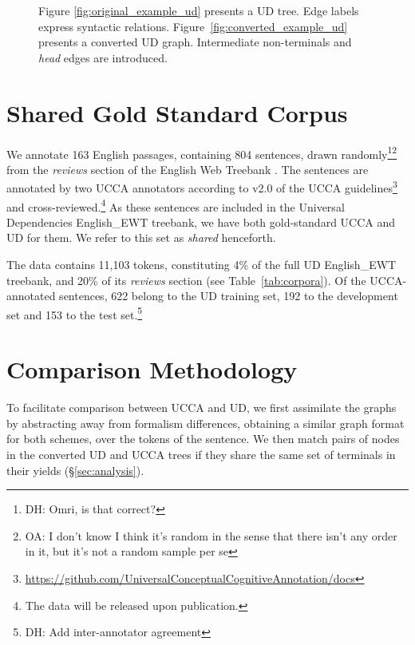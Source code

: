 \documentclass[11pt,a4paper]{article}
\newcommand{\oa}[1]{\footnote{\color{red}OA: #1}}
\newcommand{\daniel}[1]{\footnote{\color{blue}DH: #1}}
\begin{document}
\begin{figure}[!ht]
\caption{Figure \ref{fig:original_example_ud} presents a UD tree.
  Edge labels express syntactic relations.
Figure~\ref{fig:converted_example_ud} presents a converted UD graph.
Intermediate non-terminals and \textit{head} edges are introduced.
}\label{fig:ud_examples}
\end{figure}


\section{Shared Gold Standard Corpus}\label{sec:shared}

We annotate 163 English passages, containing 804 sentences,
drawn randomly\daniel{Omri, is that correct?}\oa{I don't know I think it's random in the sense that there isn't any order in it, but it's not a random sample per se} from the \textit{reviews} section of the 
English Web Treebank \cite[EWT; ][]{bies2012english}.
The sentences are annotated by two UCCA annotators
according to v2.0 of the UCCA
guidelines\footnote{\url{https://github.com/UniversalConceptualCognitiveAnnotation/docs}}
and cross-reviewed.\footnote{The data will be released upon publication.}
As these sentences are included in the Universal Dependencies 
English\_EWT treebank, we have both gold-standard UCCA and UD for them. 
We refer to this set as \textit{shared} henceforth.

The data contains 11,103 tokens, constituting 4\% of the full UD English\_EWT treebank,
and 20\% of its \textit{reviews} section
(see Table~\ref{tab:corpora}).
Of the UCCA-annotated sentences, 622 belong to the UD training set,
192 to the development set and 153 to the test set.\daniel{Add inter-annotator agreement}


\section{Comparison Methodology}\label{sec:methodology}

To facilitate comparison between UCCA and UD,
we first assimilate the graphs by abstracting away from formalism differences,
obtaining a similar graph format for both schemes,
over the tokens of the sentence.
We then match pairs of nodes in the converted UD and UCCA trees
if they share the same set of terminals in their yields (\S\ref{sec:analysis}).
\end{document}
